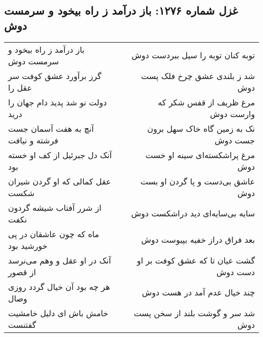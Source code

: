 \begin{center}
\section*{غزل شماره ۱۲۷۶: باز درآمد ز راه بیخود و سرمست دوش}
\label{sec:1276}
\begin{longtable}{l p{0.5cm} r}
باز درآمد ز راه بیخود و سرمست دوش
&&
توبه کنان توبه را سیل ببردست دوش
\\
گرز برآورد عشق کوفت سر عقل را
&&
شد ز بلندی عشق چرخ فلک پست دوش
\\
دولت نو شد پدید دام جهان را درید
&&
مرغ ظریف از قفس شکر که وارست دوش
\\
آنچ به هفت آسمان جست فرشته و نیافت
&&
نک به زمین گاه خاک سهل برون جست دوش
\\
آنک دل جبرئیل از کف او خسته بود
&&
مرغ پراشکسته‌ای سینه او خست دوش
\\
عقل کمالی که او گردن شیران شکست
&&
عاشق بی‌دست و پا گردن او بست دوش
\\
از شرر آفتاب شیشه گردون نکفت
&&
سایه بی‌سایه‌ای دید دراشکست دوش
\\
ماه که چون عاشقان در پی خورشید بود
&&
بعد فراق دراز خفیه بپیوست دوش
\\
آنک در او عقل و وهم می‌نرسد از قصور
&&
گشت عیان تا که عشق کوفت بر او دست دوش
\\
هر چه بود آن خیال گردد روزی وصال
&&
چند خیال عدم آمد در هست دوش
\\
خامش باش ای دلیل خامشیت گفتنست
&&
شد سر و گوشت بلند از سخن پست دوش
\\
\end{longtable}
\end{center}
